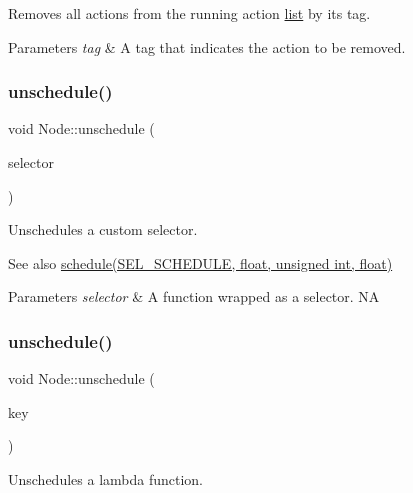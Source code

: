 Removes all actions from the running action \hyperlink{protocollist-p}{list} by its tag.


\begin{DoxyParams}{Parameters}
{\em tag} & A tag that indicates the action to be removed. \\
\hline
\end{DoxyParams}
\mbox{\label{classNode_a04fd599a10f38d31fa0c07bfda6cc90c}} 
\subsubsection{\texorpdfstring{unschedule()}{unschedule()}\hspace{0.1cm}{\footnotesize\ttfamily [1/4]}}
{\footnotesize\ttfamily void Node\+::unschedule (\begin{DoxyParamCaption}\item[{S\+E\+L\+\_\+\+S\+C\+H\+E\+D\+U\+LE}]{selector }\end{DoxyParamCaption})}

Unschedules a custom selector. \begin{DoxySeeAlso}{See also}
{\ttfamily \hyperlink{classNode_a5957efe46bfe7f83f9adb5b737f7ce11}{schedule(\+S\+E\+L\+\_\+\+S\+C\+H\+E\+D\+U\+L\+E, float, unsigned int, float)}}
\end{DoxySeeAlso}

\begin{DoxyParams}{Parameters}
{\em selector} & A function wrapped as a selector.  NA \\
\hline
\end{DoxyParams}
\mbox{\label{classNode_ad7864aa1e9a8391007eca370628d3ce7}} 
\subsubsection{\texorpdfstring{unschedule()}{unschedule()}\hspace{0.1cm}{\footnotesize\ttfamily [2/4]}}
{\footnotesize\ttfamily void Node\+::unschedule (\begin{DoxyParamCaption}\item[{const std\+::string \&}]{key }\end{DoxyParamCaption})}

Unschedules a lambda function.


